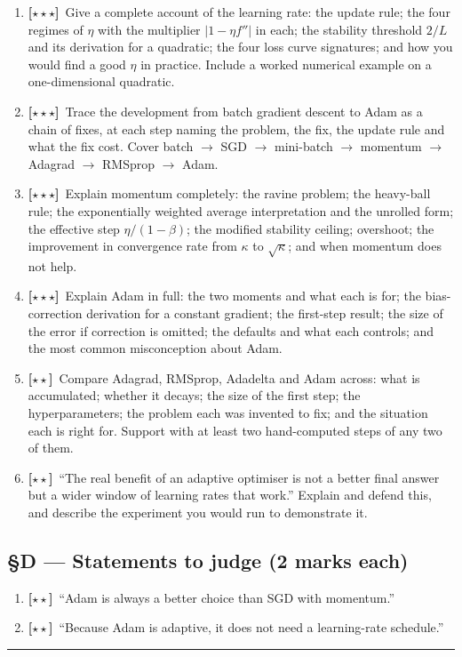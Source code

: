 \documentclass[11pt,a4paper]{article}
\newcommand{\LA}{{\footnotesize\textbf{[$\star\star\star$]}}}
\newcommand{\LB}{{\footnotesize\textbf{[$\star\star$]}}}
\newcommand{\Q}[1]{\item[\textbf{#1}]}
\begin{document}
\begin{enumerate}[leftmargin=2.2cm]
\Q{U3.45}\LA\ Give a complete account of the learning rate: the update rule;
  the four regimes of $\eta$ with the multiplier $|1-\eta f''|$ in each; the
  stability threshold $2/L$ and its derivation for a quadratic; the four loss
  curve signatures; and how you would find a good $\eta$ in practice. Include a
  worked numerical example on a one-dimensional quadratic.
\Q{U3.46}\LA\ Trace the development from batch gradient descent to Adam as a
  chain of fixes, at each step naming the problem, the fix, the update rule and
  what the fix cost. Cover batch $\to$ SGD $\to$ mini-batch $\to$ momentum
  $\to$ Adagrad $\to$ RMSprop $\to$ Adam.
\Q{U3.47}\LA\ Explain momentum completely: the ravine problem; the heavy-ball
  rule; the exponentially weighted average interpretation and the unrolled
  form; the effective step $\eta/(1-\beta)$; the modified stability ceiling;
  overshoot; the improvement in convergence rate from $\kappa$ to $\sqrt\kappa$;
  and when momentum does not help.
\Q{U3.48}\LA\ Explain Adam in full: the two moments and what each is for; the
  bias-correction derivation for a constant gradient; the first-step result;
  the size of the error if correction is omitted; the defaults and what each
  controls; and the most common misconception about Adam.
\Q{U3.49}\LB\ Compare Adagrad, RMSprop, Adadelta and Adam across: what is
  accumulated; whether it decays; the size of the first step; the
  hyperparameters; the problem each was invented to fix; and the situation each
  is right for. Support with at least two hand-computed steps of any two of
  them.
\Q{U3.50}\LB\ ``The real benefit of an adaptive optimiser is not a better final
  answer but a wider window of learning rates that work.'' Explain and defend
  this, and describe the experiment you would run to demonstrate it.
\end{enumerate}

\subsection*{§D --- Statements to judge (2 marks each)}

\begin{enumerate}[leftmargin=2.2cm]
\Q{U3.51}\LB\ ``Adam is always a better choice than SGD with momentum.''
\Q{U3.52}\LB\ ``Because Adam is adaptive, it does not need a learning-rate
  schedule.''
\end{enumerate}

\vspace{0.4em}\hrule
\end{document}
